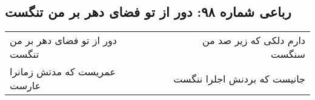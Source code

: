 \begin{center}
\section*{رباعی شماره ۹۸: دور از تو فضای دهر بر من تنگست}
\label{sec:sh098}
\begin{longtable}{l p{0.5cm} r}
دور از تو فضای دهر بر من تنگست
&&
دارم دلکی که زیر صد من سنگست
\\
عمریست که مدتش زمانرا عارست
&&
جانیست که بردنش اجلرا ننگست
\\
\end{longtable}
\end{center}
